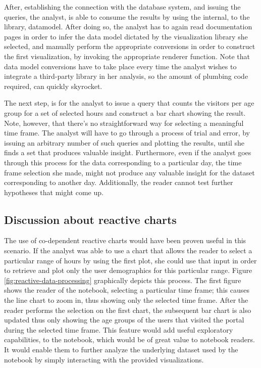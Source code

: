 After, establishing the connection with the database system, and issuing the queries, the analyst, is able to consume the results by using the internal, to the library, datamodel. After doing so, the analyst has to again read documentation pages in order to infer the data model dictated by the visualization library she selected, and manually perform the appropriate conversions in order to construct the first visualization, by invoking the appropriate renderer function. Note that data model conversions have to take place every time the analyst wishes to integrate a third-party library in her analysis, so the amount of plumbing code required, can quickly skyrocket.


The next step, is for the analyst to issue a query that counts the visitors per age group for a set of selected hours and construct a bar chart showing the result. Note, however, that there's no straightforward way for selecting a meaningful time frame. The analyst will have to go through a process of trial and error, by issuing an arbitrary number of such queries and plotting the results, until she finds a set that produces valuable insight. Furthermore, even if the analyst goes through this process for the data corresponding to a particular day, the time frame selection she made, might not produce any valuable insight for the dataset corresponding to another day. Additionally, the reader cannot test further hypotheses that might come up.

\subsection*{Discussion about reactive charts} The use of co-dependent reactive charts would have been proven useful in this scenario. If the analyst was able to use a chart that allows the reader to select a particular range of hours by using the first plot, she could use that input in order to retrieve and plot only the user demographics for this particular range. Figure \ref{fig:reactive-data-processing} graphically depicts this process. The first figure shows the reader of the notebook, selecting a particular time frame; this causes the line chart to zoom in, thus showing only the selected time frame. After the reader performs the selection on the first chart, the subsequent bar chart is also updated thus only showing the age groups of the users that visited the portal during the selected time frame. This feature would add useful exploratory capabilities, to the notebook, which would be of great value to notebook readers. It would enable them to further analyze the underlying dataset used by the notebook by simply interacting with the provided visualizations. 

